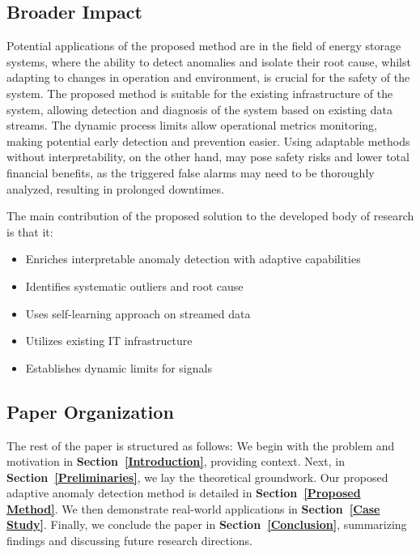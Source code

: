 \subsection{Broader Impact}
Potential applications of the proposed method are in the field of energy storage systems, where the ability to detect anomalies and isolate their root cause, whilst adapting to changes in operation and environment, is crucial for the safety of the system. The proposed method is suitable for the existing infrastructure of the system, allowing detection and diagnosis of the system based on existing data streams. The dynamic process limits allow operational metrics monitoring, making potential early detection and prevention easier. Using adaptable methods without interpretability, on the other hand, may pose safety risks and lower total financial benefits, as the triggered false alarms may need to be thoroughly analyzed, resulting in prolonged downtimes.

The main contribution of the proposed solution to the developed body of research is that it:
\begin{itemize}
\item Enriches interpretable anomaly detection with adaptive capabilities
\item Identifies systematic outliers and root cause
\item Uses self-learning approach on streamed data
\item Utilizes existing IT infrastructure
\item Establishes dynamic limits for signals
\end{itemize}

\subsection{Paper Organization}
The rest of the paper is structured as follows: We begin with the problem and motivation in \textbf{Section~\ref{Introduction}}, providing context. Next, in \textbf{Section~\ref{Preliminaries}}, we lay the theoretical groundwork. Our proposed adaptive anomaly detection method is detailed in \textbf{Section~\ref{Proposed Method}}. We then demonstrate real-world applications in \textbf{Section~\ref{Case Study}}. Finally, we conclude the paper in \textbf{Section~\ref{Conclusion}}, summarizing findings and discussing future research directions.
